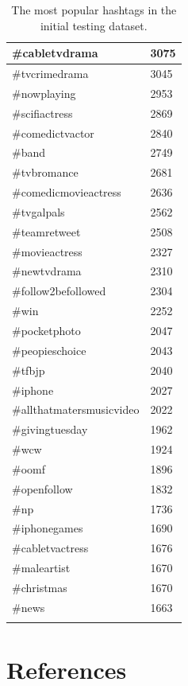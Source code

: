 \documentclass[12pt,a4paper]{article}
\begin{document}
\begin{longtable}{| l | l |}
    \#cabletvdrama              &   3075    \\ \hline
    \#tvcrimedrama              &   3045    \\ \hline
    \#nowplaying                &   2953    \\ \hline
    \#scifiactress              &   2869    \\ \hline
    \#comedictvactor            &   2840    \\ \hline
    \#band                      &   2749    \\ \hline
    \#tvbromance                &   2681    \\ \hline
    \#comedicmovieactress       &   2636    \\ \hline
    \#tvgalpals                 &   2562    \\ \hline
    \#teamretweet               &   2508    \\ \hline
    \#movieactress              &   2327    \\ \hline
    \#newtvdrama                &   2310    \\ \hline
    \#follow2befollowed         &   2304    \\ \hline
    \#win                       &   2252    \\ \hline
    \#pocketphoto               &   2047    \\ \hline
    \#peopieschoice             &   2043    \\ \hline
    \#tfbjp                     &   2040    \\ \hline
    \#iphone                    &   2027    \\ \hline
    \#allthatmatersmusicvideo   &   2022    \\ \hline
    \#givingtuesday             &   1962    \\ \hline
    \#wcw                       &   1924    \\ \hline
    \#oomf                      &   1896    \\ \hline
    \#openfollow                &   1832    \\ \hline
    \#np                        &   1736    \\ \hline
    \#iphonegames               &   1690    \\ \hline
    \#cabletvactress            &   1676    \\ \hline
    \#maleartist                &   1670    \\ \hline
    \#christmas                 &   1670    \\ \hline
    \#news                      &   1663    \\ \hline

    \caption{The most popular hashtags in the initial testing dataset.}
    \label{tbl:hashtags}
\end{longtable}


\setcounter{secnumdepth}{0}
\section{References}
{\footnotesize \printbibliography[heading=none]}
\end{document}
